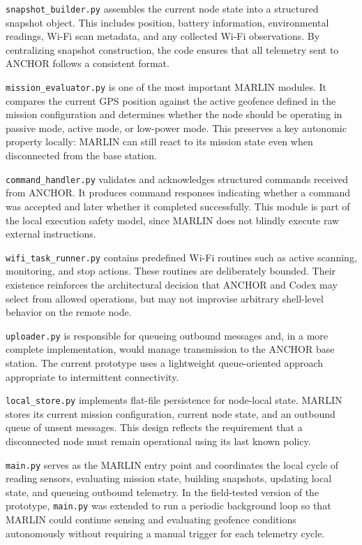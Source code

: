\documentclass[journal]{IEEEtran}
\begin{document}
\texttt{snapshot\_builder.py} assembles the current node state into a structured snapshot object. This includes position, battery information, environmental readings, Wi-Fi scan metadata, and any collected Wi-Fi observations. By centralizing snapshot construction, the code ensures that all telemetry sent to ANCHOR follows a consistent format.

\texttt{mission\_evaluator.py} is one of the most important MARLIN modules. It compares the current GPS position against the active geofence defined in the mission configuration and determines whether the node should be operating in passive mode, active mode, or low-power mode. This preserves a key autonomic property locally: MARLIN can still react to its mission state even when disconnected from the base station.

\texttt{command\_handler.py} validates and acknowledges structured commands received from ANCHOR. It produces command responses indicating whether a command was accepted and later whether it completed successfully. This module is part of the local execution safety model, since MARLIN does not blindly execute raw external instructions.

\texttt{wifi\_task\_runner.py} contains predefined Wi-Fi routines such as active scanning, monitoring, and stop actions. These routines are deliberately bounded. Their existence reinforces the architectural decision that ANCHOR and Codex may select from allowed operations, but may not improvise arbitrary shell-level behavior on the remote node.

\texttt{uploader.py} is responsible for queueing outbound messages and, in a more complete implementation, would manage transmission to the ANCHOR base station. The current prototype uses a lightweight queue-oriented approach appropriate to intermittent connectivity.

\texttt{local\_store.py} implements flat-file persistence for node-local state. MARLIN stores its current mission configuration, current node state, and an outbound queue of unsent messages. This design reflects the requirement that a disconnected node must remain operational using its last known policy.

\texttt{main.py} serves as the MARLIN entry point and coordinates the local cycle of reading sensors, evaluating mission state, building snapshots, updating local state, and queueing outbound telemetry. In the field-tested version of the prototype, \texttt{main.py} was extended to run a periodic background loop so that MARLIN could continue sensing and evaluating geofence conditions autonomously without requiring a manual trigger for each telemetry cycle.
\end{document}
